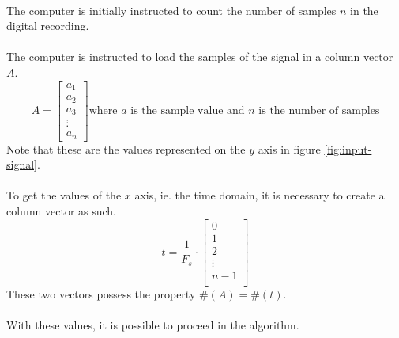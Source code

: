 \documentclass{article}
\begin{document}
\paragraph*{}
The computer is initially instructed to count the number of samples $n$ in the
digital recording.

\paragraph*{}
The computer is instructed to load the samples of the signal in a column vector
$A$.
$$A =
\begin{bmatrix}
	a_1 \\
	a_2 \\
	a_3 \\
	\vdots \\
	a_{n}
\end{bmatrix}\text{where $a$ is the sample value and $n$ is the number of
samples}
$$
Note that these are the values represented on the $y$ axis in figure
\ref{fig:input-signal}.

\paragraph*{}
To get the values of the $x$ axis, ie. the time domain, it is necessary to
create a column vector as such.
$$t = \frac{1}{F_s} \cdot
\begin{bmatrix}
	0 \\
	1 \\
	2 \\
	\vdots \\
	n-1 \\
\end{bmatrix}
$$
These two vectors possess the property $\#(A) = \#(t)$.

\paragraph*{}
With these values, it is possible to proceed in the algorithm.
\end{document}
